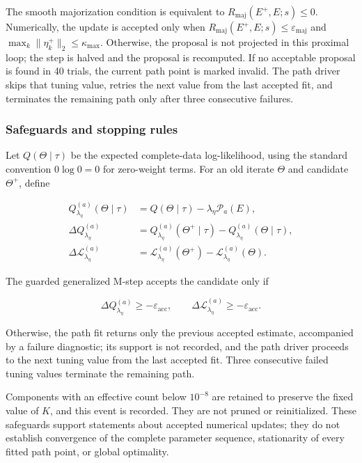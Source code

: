 \documentclass[preprint,12pt,authoryear]{elsarticle}
\begin{document}
The smooth majorization condition is equivalent to
$R_{\mathrm{maj}}(E^+,E;s)\leq0$. Numerically, the update is accepted only when
$R_{\mathrm{maj}}(E^+,E;s)\leq\varepsilon_{\mathrm{maj}}$ and
$\max_k\lVert\eta_k^+\rVert_2\leq\kappa_{\max}$. Otherwise, the proposal is
not projected in this proximal loop; the step is halved and the proposal is
recomputed. If
no acceptable proposal is found in 40 trials, the current path point is marked
invalid. The path driver skips that tuning value, retries the next value from
the last accepted fit, and terminates the remaining path only after three
consecutive failures.

\subsubsection{Safeguards and stopping rules}

Let $Q(\Theta\mid\tau)$ be the expected complete-data log-likelihood, using
the standard convention $0\log 0=0$ for zero-weight terms. For an old iterate
$\Theta$ and candidate $\Theta^+$, define

\begin{equation}
\label{eq:acceptance-increments}
\begin{aligned}
Q_{\lambda_\eta}^{(a)}(\Theta\mid\tau)
&=Q(\Theta\mid\tau)-\lambda_\eta\mathcal P_a(E),\\
\Delta Q_{\lambda_\eta}^{(a)}
&=Q_{\lambda_\eta}^{(a)}(\Theta^+\mid\tau)
-Q_{\lambda_\eta}^{(a)}(\Theta\mid\tau),\\
\Delta\mathcal L_{\lambda_\eta}^{(a)}
&=\mathcal L_{\lambda_\eta}^{(a)}(\Theta^+)
-\mathcal L_{\lambda_\eta}^{(a)}(\Theta).
\end{aligned}
\end{equation}

The guarded generalized M-step accepts the candidate only if

\begin{equation}
\label{eq:outer-acceptance}
\Delta Q_{\lambda_\eta}^{(a)}\geq-\varepsilon_{\mathrm{acc}},
\qquad
\Delta\mathcal L_{\lambda_\eta}^{(a)}\geq-\varepsilon_{\mathrm{acc}}.
\end{equation}

Otherwise, the path fit returns only the previous accepted estimate,
accompanied by a failure diagnostic; its support is not recorded, and the
path driver proceeds to the next tuning value from the last accepted fit.
Three consecutive failed tuning values terminate the remaining path.

Components with an effective count below $10^{-8}$ are retained to preserve
the fixed value of $K$, and this event is recorded. They are not pruned or
reinitialized. These safeguards support statements about accepted numerical
updates; they do not establish convergence of the complete parameter sequence,
stationarity of every fitted path point, or global optimality.
\end{document}

